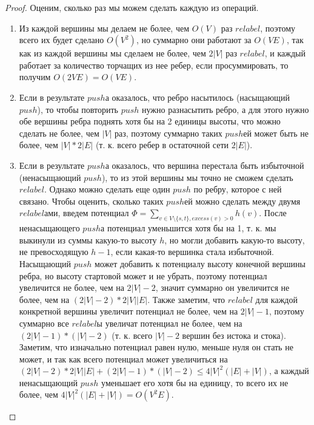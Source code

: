 \begin{proof}
    Оценим, сколько раз мы можем сделать каждую из операций.
    \begin{enumerate}
        \item Из каждой вершины мы делаем не более, чем $O(V)$ раз $relabel$, поэтому всего их будет сделано $O(V^2)$, но суммарно они работают за $O(VE)$, так как из каждой вершины мы сделаем не более, чем $2|V|$ раз $relabel$, и каждый работает за количество торчащих из нее ребер, если просуммировать, то получим $O(2VE) = O(VE)$.
        \item Если в результате $push$а оказалось, что ребро насытилось (насыщающий $push$), то чтобы повторить $push$ нужно разнасытить ребро, а для этого нужно обе вершины ребра поднять хотя бы на 2 единицы высоты, что можно сделать не более, чем $|V|$ раз, поэтому суммарно таких $push$ей может быть не более, чем $|V| * 2|E|$ (т. к. всего ребер в остаточной сети $2|E|$).
        \item Если в результате $push$а оказалось, что вершина перестала быть избыточной (ненасыщающий $push$), то из этой вершины мы точно не сможем сделать $relabel$. Однако можно сделать еще один $push$ по ребру, которое с ней связано. Чтобы оценить, сколько таких $push$ей можно сделать между двумя $relabel$ами, введем потенциал $\Phi = \sum_{v \in V \setminus \{s, t\}, excess(v) > 0} h(v)$. После ненасыщающего $push$а потенциал уменьшится хотя бы на 1, т. к. мы выкинули из суммы какую-то высоту $h$, но могли добавить какую-то высоту, не превосходящую $h - 1$, если какая-то вершинка стала избыточной. Насыщающий $push$ может добавить к потенциалу высоту конечной вершины ребра, но высоту стартовой может и не убрать, поэтому потенциал увеличится не более, чем на $2|V| - 2$, значит суммарно он увеличится не более, чем на $(2|V| - 2) * 2|V||E|$. Также заметим, что $relabel$ для каждой конкретной вершины увеличит потенциал не более, чем на $2|V| - 1$, поэтому суммарно все $relabel$ы увеличат потенциал не более, чем на $(2|V| - 1) * (|V| - 2)$ (т. к. всего $|V| - 2$ вершин без истока и стока). Заметим, что изначально потенциал равен нулю, меньше нуля он стать не может, и так как всего потенциал может увеличиться на $(2|V| - 2) * 2|V||E| + (2|V| - 1) * (|V| - 2) \leq 4|V|^2(|E| + |V|)$, а каждый ненасыщающий $push$ уменьшает его хотя бы на единицу, то всего их не более, чем $4|V|^2(|E| + |V|) = O(V^2E)$.
    \end{enumerate}
\end{proof}


